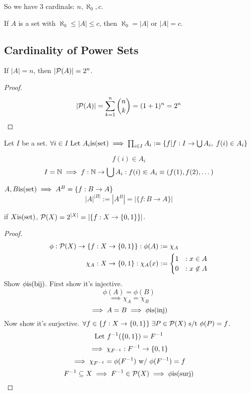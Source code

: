 \documentclass[12pt]{article}
\begin{document}
So we have 3 cardinals: \(n,\aleph_0,c\).


\bbox
\begin{axim}\label{axim:continuum_hypth}
  If \(A\) is a set with \(\aleph_0\le|A|\le c\), then
  \(\aleph_0=|A|\) or \(|A|=c\).
\end{axim}
\ebox

\subsection{Cardinality of Power Sets}


\bbox
\begin{prop}
  If \(|A|=n\), then \(|\mathcal P(A)|=2^n\).
\end{prop}
\ebox
\bboxproof
\begin{proof}[Proof]
  \[|\mathcal P(A)|=\sum_{k=1}^n\binom nk=(1+1)^n=2^n\]
\end{proof}
\ebox





\bbox
\begin{defn}\label{defn:cartesian_product}
  Let \(I\) be a set. \(\forall i \in I\;\text{Let }A_i\mathrm{is}(\mathrm{set})\implies
  \prod_{i\in I}A_i:=\{f|f:I\to\bigcup A_i,\;f(i)\in A_i\}\)
\end{defn}
\ebox


\bboxnote
\[f(i)\in A_i\]
\[I=\mathbb N\implies f:\mathbb N\to\bigcup A_i:f(i):\!\in A_i\equiv(f(1),f(2),\dots)\]
\ebox

\bbox
\begin{defn}\label{defn:set_power}
  \(A,B\mathrm{is}(\mathrm{set})\implies A^B=\{f:B\to A\}\)
  \[|A|^{|B|}:=\left|A^B\right|=|\{f:B\to A\}|\]
\end{defn}
\ebox

\bbox
\begin{prop}\label{prop:card_of_powerset}
  if \(X\mathrm{is}(\mathrm{set})\), \(\mathcal P(X)=2^{|X|}=|\{f:X\to\{0,1\}\}|\).
\end{prop}
\ebox

\bboxproof
\begin{proof}
  \begin{equation*}
    \begin{split}
      \phi:\mathcal P(X)\to\{f:X\to\{0,1\}\}:\phi(A)&:=\chi_A\\
      \chi_A:X\to\{0,1\}:\chi_A(x)&:=
      \begin{cases}
        1 &: x\in A\\
        0 &: x\not\in A
      \end{cases}
    \end{split}
  \end{equation*}
  Show \(\phi\mathrm{is}(\mathrm{bij})\). First show it's injective.
  \[\phi(A)=\phi(B)\]
  \[\implies\chi_A=\chi_B\] %
  \[\implies A=B\implies\phi\mathrm{is}(\mathrm{inj})\] %
  Now show it's surjective. \(\forall f\in\{f:X\to\{0,1\}\}\;\exists P\in \mathcal P(X)\text{ s/t }
  \phi(P)=f\).
  \[\text{Let }f^{-1}(\{0,1\})=F^{-1}\]
  \[\implies \chi_{F^{-1}}:F^{-1}\to\{0,1\}\]
  \[\implies\chi_{F^{-1}}=\phi(F^{-1})\text{ w/ }\phi(F^{-1})=f\]
  \[F^{-1}\subseteq X\implies F^{-1}\in\mathcal P(X)\implies \phi\mathrm{is}(\mathrm{surj})\]
\end{proof}
\ebox
\end{document}
